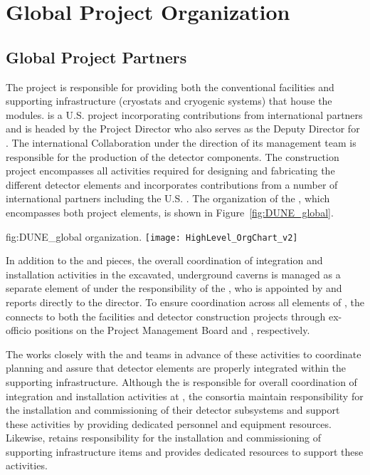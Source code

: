 \chapter{Global Project Organization}
\label{vl:tc-global}

\section{Global Project Partners}
\label{sec:partners}

The  project is responsible for providing both the 
conventional facilities and supporting infrastructure (cryostats 
and cryogenic systems) that house the   
modules.  is a U.S.  project incorporating 
contributions from international partners and is headed by the 
 Project Director who also serves as the  
Deputy Director for .  The international  
Collaboration under the direction of its management team is 
responsible for the production of the detector components.  The 
  construction project encompasses all 
activities required for designing and fabricating the different 
detector elements and incorporates contributions from a number 
of international partners including the U.S. .  The 
organization of the , which encompasses 
both project elements, is shown in Figure~\ref{fig:DUNE_global}.
\begin{dunefigure}{fig:DUNE_global}
  { organization.}
  \texttt{[image: HighLevel\_OrgChart\_v2]}
\end{dunefigure}

In addition to the  and  pieces, the 
overall coordination of integration and installation activities 
in the excavated, underground caverns is managed as a separate
element of  under the responsibility of 
the , who is appointed by and reports directly to the 
 director.  To ensure coordination 
across all elements of , the  connects 
to both the facilities and detector construction projects through 
ex-officio positions on the  Project Management Board 
and  , respectively.

The  works closely with the  and 
teams in advance of these activities to coordinate planning
and assure that detector elements are properly integrated within the 
supporting infrastructure.  Although the  is responsible 
for overall coordination of integration and installation activities
at , the  consortia maintain responsibility 
for the installation and commissioning of their detector subsystems
and support these activities by providing dedicated personnel and
equipment resources.  Likewise,  retains responsibility
for the installation and commissioning of supporting infrastructure
items and provides dedicated resources to support these activities.          

